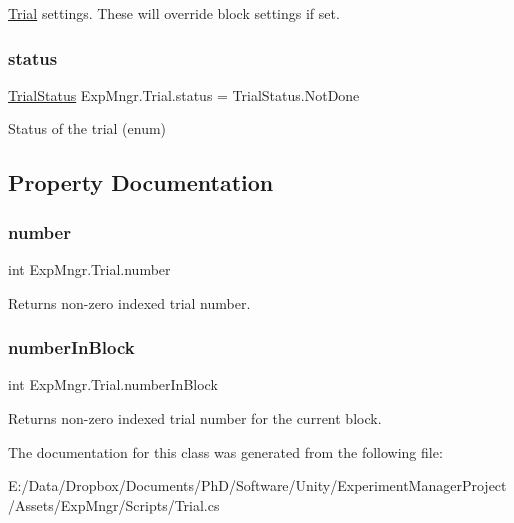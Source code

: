 \hyperlink{class_exp_mngr_1_1_trial}{Trial} settings. These will override block settings if set. 

\mbox{\label{class_exp_mngr_1_1_trial_a1725d79305b17692b7be6075c00fa026}} 
\subsubsection{\texorpdfstring{status}{status}}
{\footnotesize\ttfamily \hyperlink{namespace_exp_mngr_a8a72f39778ead3dc04af13a60949175c}{Trial\+Status} Exp\+Mngr.\+Trial.\+status = Trial\+Status.\+Not\+Done}



Status of the trial (enum) 



\subsection{Property Documentation}
\mbox{\label{class_exp_mngr_1_1_trial_ad581be1a1aa77dbeb93ccd9721c1f8a2}} 
\subsubsection{\texorpdfstring{number}{number}}
{\footnotesize\ttfamily int Exp\+Mngr.\+Trial.\+number\hspace{0.3cm}{\ttfamily [get]}}



Returns non-\/zero indexed trial number. 

\mbox{\label{class_exp_mngr_1_1_trial_ad0730e34a2ae268037c3d396b8863921}} 
\subsubsection{\texorpdfstring{number\+In\+Block}{numberInBlock}}
{\footnotesize\ttfamily int Exp\+Mngr.\+Trial.\+number\+In\+Block\hspace{0.3cm}{\ttfamily [get]}}



Returns non-\/zero indexed trial number for the current block. 



The documentation for this class was generated from the following file\+:\begin{DoxyCompactItemize}
\item 
E\+:/\+Data/\+Dropbox/\+Documents/\+Ph\+D/\+Software/\+Unity/\+Experiment\+Manager\+Project/\+Assets/\+Exp\+Mngr/\+Scripts/Trial.\+cs\end{DoxyCompactItemize}
